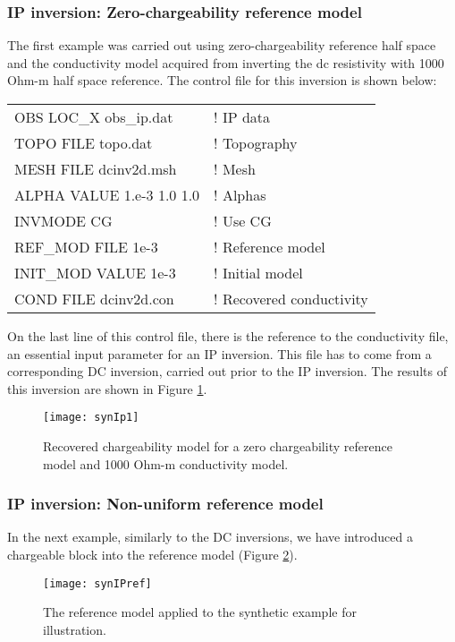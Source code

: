 \subsubsection{IP inversion: Zero-chargeability reference model}
The first example was carried out using zero-chargeability reference half space and the conductivity model acquired from inverting the dc resistivity with 1000 Ohm-m half space reference. The control file for this inversion is shown below:
%
\begin{fileExample}
\begin{tabular}{|ll|}
\hline
OBS LOC\_X obs\_ip.dat & ! IP data \\
TOPO FILE topo.dat & ! Topography\\
MESH FILE dcinv2d.msh & ! Mesh \\
ALPHA VALUE 1.e-3 1.0 1.0 & ! Alphas \\
INVMODE CG & ! Use CG \\
REF\_MOD FILE 1e-3 & ! Reference model \\
INIT\_MOD VALUE 1e-3 & ! Initial model \\
COND FILE dcinv2d.con & ! Recovered conductivity \\
\hline
\end{tabular}
\end{fileExample}
%
On the last line of this control file, there is the reference to the conductivity file, an essential input parameter for an IP inversion. This file has to come from a corresponding DC inversion, carried out prior to the IP inversion. The results of this inversion are shown in Figure \ref{fig:synIp1}.
%
\begin{figure}
\centering
\texttt{[image: synIp1]}
\caption{Recovered chargeability model for a zero chargeability reference model and 1000 Ohm-m conductivity model.}
\label{fig:synIp1}
\end{figure}

\subsubsection{IP inversion: Non-uniform reference model}
In the next example, similarly to the DC inversions, we have introduced a chargeable block into the reference model (Figure \ref{fig:synIPref}).
%
\begin{figure}
\centering
\texttt{[image: synIPref]}
\caption{The reference model applied to the synthetic example for illustration.}
\label{fig:synIPref}
\end{figure}


